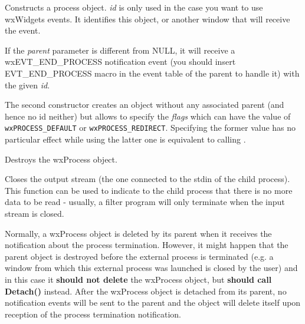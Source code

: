 \label{wxprocessctor}



Constructs a process object. {\it id} is only used in the case you want to
use wxWidgets events. It identifies this object, or another window that will
receive the event.

If the {\it parent} parameter is different from NULL, it will receive
a wxEVT\_END\_PROCESS notification event (you should insert EVT\_END\_PROCESS
macro in the event table of the parent to handle it) with the given {\it id}.

The second constructor creates an object without any associated parent (and
hence no id neither) but allows to specify the {\it flags} which can have the
value of {\tt wxPROCESS\_DEFAULT} or {\tt wxPROCESS\_REDIRECT}. Specifying the
former value has no particular effect while using the latter one is equivalent
to calling .





\label{wxprocessdtor}


Destroys the wxProcess object.

\label{wxprocesscloseoutput}


Closes the output stream (the one connected to the stdin of the child
process). This function can be used to indicate to the child process that
there is no more data to be read - usually, a filter program will only
terminate when the input stream is closed.

\label{wxprocessdetach}


Normally, a wxProcess object is deleted by its parent when it receives the
notification about the process termination. However, it might happen that the
parent object is destroyed before the external process is terminated (e.g. a
window from which this external process was launched is closed by the user)
and in this case it {\bf should not delete} the wxProcess object, but
{\bf should call Detach()} instead. After the wxProcess object is detached
from its parent, no notification events will be sent to the parent and the
object will delete itself upon reception of the process termination
notification.

